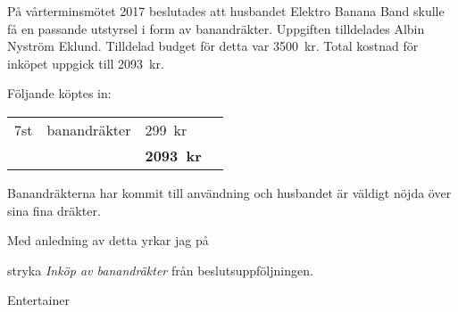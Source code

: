 \documentclass[../_main/handlingar.tex]{subfiles}
\begin{document}

På vårterminsmötet 2017 beslutades att husbandet Elektro Banana Band skulle få en passande utstyrsel i form av banandräkter. Uppgiften tilldelades Albin Nyström Eklund. Tilldelad budget för detta var \SI{3500}{kr}. Total kostnad för inköpet uppgick till \SI{2093}{kr}.

Följande köptes in:
\begin{table}[H]
\begin{tabular}{l l l r}
    7st & banandräkter & \SI{299}{kr}\\
    & & \textbf{\SI{2093}{kr}}\\
\end{tabular}
\end{table}

Banandräkterna har kommit till användning och husbandet är väldigt nöjda över sina fina dräkter.

Med anledning av detta yrkar jag på

\begin{attsatser}
    \att stryka \emph{Inköp av banandräkter} från beslutsuppföljningen.
\end{attsatser}

\begin{signatures}{1}
    \mvh
    \signature{Albin Nyström Eklund}{Entertainer}
\end{signatures}
\end{document}
